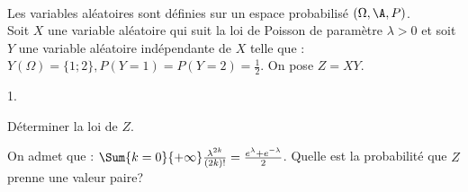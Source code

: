 \documentclass[11pt]{article}%
\begin{document}

\begin{exerciceSP}~\\
  Les variables aléatoires sont définies sur un espace probabilisé
  $(\Omega , \A , P)$. \\ 
  Soit $X$ une variable aléatoire qui suit la loi de Poisson de
  paramètre $\lambda > 0$ et soit $Y$ une variable aléatoire
  indépendante de $X$ telle que : $ Y ( \Omega ) = \{ 1 ; 2 \} , P ( Y
  = 1 ) = P ( Y = 2 ) = \frac{ 1 }{ 2 }$. On pose $Z = X Y$.
  \begin{noliste}{1.}
    \setlength{\itemsep}{2mm}

  \item Déterminer la loi de $Z$.

  \item On admet que : $\Sum{ k = 0 }{ +\infty } \frac{ \lambda^{ 2k }
    }{ (2k)! } = \frac{ e^{ \lambda } + e^{ - \lambda } }{ 2 }
    $. Quelle est la probabilité que $Z$ prenne une valeur paire?

  \end{noliste}
\end{exerciceSP}

\end{document}
